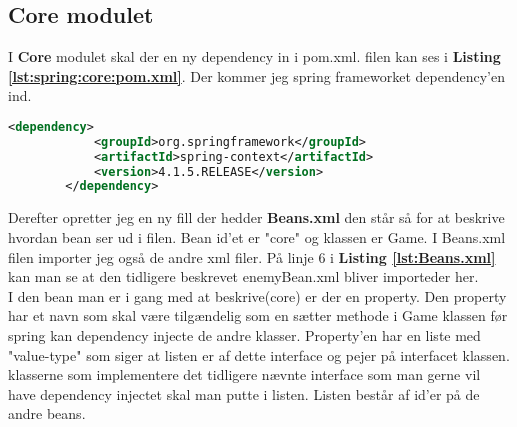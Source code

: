 \subsection{Core modulet}%
\label{sub:core_modulet}



I \textbf{Core} modulet skal der en ny dependency in i pom.xml. filen kan ses i
\textbf{\textbf{Listing \ref{lst:spring:core:pom.xml}}}. Der kommer jeg spring frameworket
dependency'en ind.


\begin{lstlisting}[caption={core:pom.xml}, label={lst:spring:core:pom.xml}, language=xml, firstnumber=92]
        <dependency>
            <groupId>org.springframework</groupId>
            <artifactId>spring-context</artifactId>
            <version>4.1.5.RELEASE</version>
        </dependency>
\end{lstlisting}

Derefter opretter jeg en ny fill der hedder \textbf{Beans.xml} den står så for
at beskrive hvordan bean ser ud i filen. Bean id'et er "core" og klassen er
Game. I Beans.xml filen importer jeg også de andre xml filer. På linje
6 i \textbf{Listing \ref{lst:Beans.xml}} kan man se at den tidligere beskrevet
enemyBean.xml bliver importeder her. \\
I den bean man er i gang med at beskrive(core) er der en property. Den property
har et navn som skal være tilgændelig som en sætter methode i Game klassen før
spring kan dependency injecte de andre klasser. Property'en har en liste med
"value-type" som siger at listen er af dette interface og pejer på interfacet
klassen.  klasserne som implementere det tidligere nævnte interface som man
gerne vil have dependency injectet skal man putte i listen. Listen består af
id'er på de andre beans. 


\hfill \linebreak
\hline
{}
\hline
\hfill \linebreak

